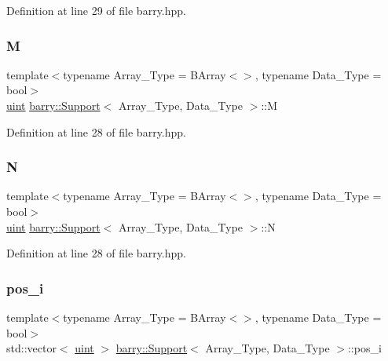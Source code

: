 Definition at line 29 of file barry.\+hpp.

\mbox{\label{classbarry_1_1_support_aaceb2f83d235c70034e089087991cff8}} 
\subsubsection{\texorpdfstring{M}{M}}
{\footnotesize\ttfamily template$<$typename Array\+\_\+\+Type  = B\+Array$<$$>$, typename Data\+\_\+\+Type  = bool$>$ \\
\hyperlink{namespacebarry_a11dfc53ddb4672278319aa04f1e09a6c}{uint} \hyperlink{classbarry_1_1_support}{barry\+::\+Support}$<$ Array\+\_\+\+Type, Data\+\_\+\+Type $>$\+::M}



Definition at line 28 of file barry.\+hpp.

\mbox{\label{classbarry_1_1_support_a1e3158ceae716505cb0c5fb14374be9b}} 
\subsubsection{\texorpdfstring{N}{N}}
{\footnotesize\ttfamily template$<$typename Array\+\_\+\+Type  = B\+Array$<$$>$, typename Data\+\_\+\+Type  = bool$>$ \\
\hyperlink{namespacebarry_a11dfc53ddb4672278319aa04f1e09a6c}{uint} \hyperlink{classbarry_1_1_support}{barry\+::\+Support}$<$ Array\+\_\+\+Type, Data\+\_\+\+Type $>$\+::N}



Definition at line 28 of file barry.\+hpp.

\mbox{\label{classbarry_1_1_support_ac6012c953dd04c2e74c2105b193f50ac}} 
\subsubsection{\texorpdfstring{pos\+\_\+i}{pos\_i}}
{\footnotesize\ttfamily template$<$typename Array\+\_\+\+Type  = B\+Array$<$$>$, typename Data\+\_\+\+Type  = bool$>$ \\
std\+::vector$<$ \hyperlink{namespacebarry_a11dfc53ddb4672278319aa04f1e09a6c}{uint} $>$ \hyperlink{classbarry_1_1_support}{barry\+::\+Support}$<$ Array\+\_\+\+Type, Data\+\_\+\+Type $>$\+::pos\+\_\+i}




